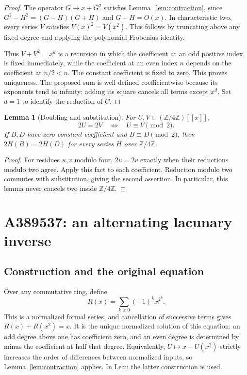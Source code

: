 \documentclass[11pt,a4paper]{article}
\newtheorem{lemma}[theorem]{Lemma}
\theoremstyle{remark}
\newcommand{\Z}{\mathbb Z}
\begin{document}
\begin{proof}
The operator $G\mapsto x+G^2$ satisfies Lemma~\ref{lem:contraction},
since $G^2-H^2=(G-H)(G+H)$ and $G+H=O(x)$. In characteristic two,
every series $V$ satisfies $V(x)^2=V(x^2)$. This follows by truncating
above any fixed degree and applying the polynomial Frobenius identity.

Thus $V+V^2=x^d$ is a recursion in which the coefficient at an odd positive
index is fixed immediately, while the coefficient at an even index $n$
depends on the coefficient at $n/2<n$. The constant coefficient is fixed
to zero. This proves uniqueness. The proposed sum is well-defined
coefficientwise because its exponents tend to infinity; adding its square
cancels all terms except $x^d$. Set $d=1$ to identify the reduction of $C$.
\end{proof}

\begin{lemma}[Doubling and substitution]\label{lem:double}
For $U,V\in(\Z/4\Z)[[x]]$,
\[
 2U=2V\quad\Longleftrightarrow\quad
 U\equiv V\pmod2.
\]
If $B,D$ have zero constant coefficient and $B\equiv D\pmod2$, then
$2H(B)=2H(D)$ for every series $H$ over $\Z/4\Z$.
\end{lemma}

\begin{proof}
For residues $u,v$ modulo four, $2u=2v$ exactly when their reductions modulo
two agree. Apply this fact to each coefficient. Reduction modulo two
commutes with substitution, giving the second assertion. In particular,
this lemma never cancels two inside $\Z/4\Z$.
\end{proof}

\section{A389537: an alternating lacunary inverse}

\subsection{Construction and the original equation}

Over any commutative ring, define
\begin{equation}\label{eq:lacunaryR}
 R(x)=\sum_{k\ge0}(-1)^kx^{2^k}.
\end{equation}
This is a normalized formal series, and cancellation of successive terms
gives $R(x)+R(x^2)=x$. It is the unique normalized solution of this
equation: an odd degree above one has coefficient zero, and an even
degree is determined by minus the coefficient at half that degree.
Equivalently, $U\mapsto x-U(x^2)$ strictly increases the order of
differences between normalized inputs, so Lemma~\ref{lem:contraction}
applies. In Lean the latter construction is used.
\end{document}
